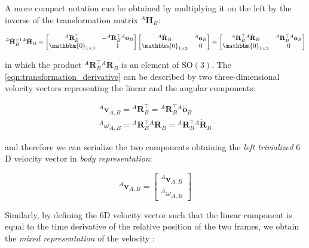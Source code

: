 A more compact notation can be obtained by multiplying it on the left by the inverse of the transformation matrix ${}^A\mathbf{H} _B$:

\begin{equation}
    {}^A\dot{\mathbf{H}} _B ^{-1} {}^A\dot{\mathbf{H}} _B =
    \begin{bmatrix}
        {}^A\mathbf{R}_B^\top     & -{}^A\mathbf{R}_B^\top {}^A\mathbf{o}_B \\
        \mathbbm{0} _{1 \times 3} & 1
    \end{bmatrix}
    \begin{bmatrix}
        {}^A\dot{\mathbf{R}}_B    & {}^A\dot{\mathbf{o}}_B \\
        \mathbbm{0} _{1 \times 3} & 0
    \end{bmatrix} =
    \begin{bmatrix}
        {}^A\mathbf{R}_B^\top {}^A\dot{\mathbf{R}}_B & {}^A\mathbf{R}_B^\top {}^A\dot{\mathbf{o}}_B \\
        \mathbbm{0} _{1 \times 3}                    & 0
    \end{bmatrix}
\end{equation}

in which the product ${}^A\mathbf{R}_B^\top {}^A\dot{\mathbf{R}}_B$ is an element of $\mathrm{SO}(3)$. The \cref{eqn:transformation_derivative} can be described by two three-dimensional velocity vectors representing the linear and the angular components:

\begin{align}
    {}^A\mathbf{v}_{A,B} = {}^A\mathbf{R}_B^\top = {}^A\mathbf{R}_B^\top {}^A\dot{\mathbf{o}}_B \\
    {}^A\omega_{A,B} = {}^A\mathbf{R}_B^\top {}^A\mathbf{R}_B = {}^A\mathbf{R}_B^\top {}^A\dot{\mathbf{R}}_B
\end{align}

and therefore we can serialize the two components obtaining the \textit{left trivialized} $6$D velocity vector in \textit{body representation}:

\begin{equation}
    \label{eqn:left_trivialized}
    {}^A\mathbf{v}_{A,B} = \begin{bmatrix}
        {}^A\mathbf{v}_{A,B} \\
        {}^A\omega_{A,B}
    \end{bmatrix}
\end{equation}

Similarly, by defining the $6$D velocity vector such that the linear component is equal to the time derivative of the relative position of the two frames, we obtain the \textit{mixed representation} of the velocity \citep{traversaro_modelling_2019}:

